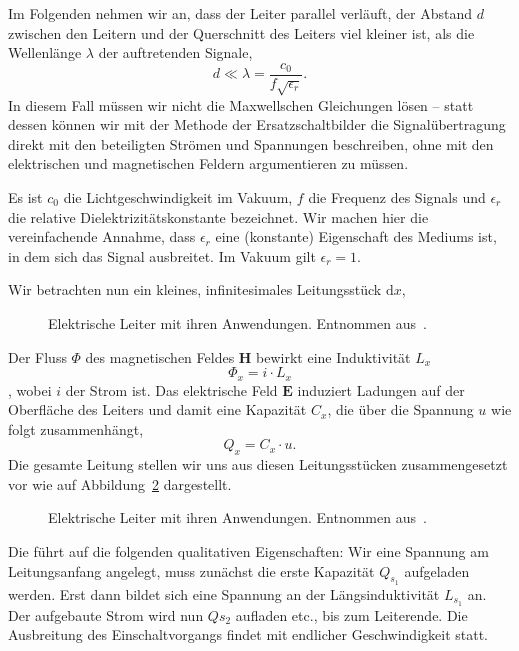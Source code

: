 \documentclass[paper=a4, parskip=half-, ngerman, fontsize=11pt]{scrreprt}
\begin{document}
Im Folgenden nehmen wir an, dass der Leiter parallel verläuft, der Abstand $d$ zwischen den Leitern und der Querschnitt
des Leiters viel kleiner ist, als die Wellenlänge $\lambda$ der auftretenden Signale,
\[ d \ll \lambda = \frac{c_{0}}{f \sqrt{\epsilon_{r}}}. \]
In diesem Fall müssen wir nicht die Maxwellschen Gleichungen
lösen -- statt dessen können wir mit der Methode der Ersatzschaltbilder die Signalübertragung direkt mit den
beteiligten Strömen und Spannungen beschreiben, ohne mit den elektrischen und magnetischen Feldern
argumentieren zu müssen.

Es ist $c_{0}$ die Lichtgeschwindigkeit im Vakuum, $f$ die Frequenz des Signals und $\epsilon_{r}$ die relative
Dielektrizitätskonstante bezeichnet. Wir machen hier die vereinfachende Annahme, dass $\epsilon_{r}$ eine (konstante)
Eigenschaft des Mediums ist, in dem sich das Signal ausbreitet. Im Vakuum gilt $\epsilon_{r} = 1$.


Wir betrachten nun ein kleines, infinitesimales Leitungsstück $\mathrm{d}x$,
\begin{figure}[!h]
    \begin{center}
        
        \caption{Elektrische Leiter mit ihren Anwendungen. Entnommen aus~\cite{LeitungenUndFilter}.}
        \label{Leitung1}
    \end{center}
\end{figure}

Der Fluss $\Phi$ des magnetischen Feldes $\textbf{H}$ bewirkt eine Induktivität $L_{x}$
\[ \Phi_{x} = i \cdot L_{x} \], wobei $i$ der Strom ist.
Das elektrische Feld $\textbf{E}$ induziert Ladungen auf der Oberfläche des Leiters und damit eine Kapazität $C_{x}$,
die über die Spannung $u$ wie folgt zusammenhängt,
\[ Q_{x} = C_{x} \cdot u . \]
Die gesamte Leitung stellen wir uns aus diesen Leitungsstücken zusammengesetzt vor wie auf Abbildung~\ref{Leitung2}
dargestellt.
\begin{figure}[!h]
    \begin{center}
        
        \caption{Elektrische Leiter mit ihren Anwendungen. Entnommen aus~\cite{LeitungenUndFilter}.}
        \label{Leitung2}
    \end{center}
\end{figure}
Die führt auf die folgenden qualitativen Eigenschaften: Wir eine Spannung am Leitungsanfang angelegt, muss zunächst die
erste Kapazität $Q_{s_{1}}$ aufgeladen werden. Erst dann bildet sich eine Spannung an der Längsinduktivität $L_{s_{1}}$
an. Der aufgebaute Strom wird nun $Q{s_{2}}$ aufladen etc., bis zum Leiterende. Die Ausbreitung des Einschaltvorgangs
findet mit endlicher Geschwindigkeit statt.
\end{document}
